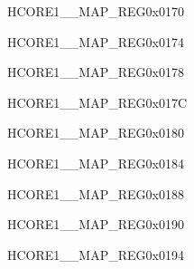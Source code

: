 \begin{register}{H}{CORE1\_\_MAP\_REG}{0x0170}\label{regdesc:CORE1SBDINTMAPREG}
\end{register}\vspace{-3em}


\begin{register}{H}{CORE1\_\_MAP\_REG}{0x0174}\label{regdesc:CORE1USBOTGINTMAPREG}
\end{register}\vspace{-3em}


\begin{register}{H}{CORE1\_\_MAP\_REG}{0x0178}\label{regdesc:CORE1USBOTGENDPMULTIPROCINTMAPREG}
\end{register}\vspace{-3em}


\begin{register}{H}{CORE1\_\_MAP\_REG}{0x017C}\label{regdesc:CORE1JPEGINTMAPREG}
\end{register}\vspace{-3em}


\begin{register}{H}{CORE1\_\_MAP\_REG}{0x0180}\label{regdesc:CORE1PPAINTMAPREG}
\end{register}\vspace{-3em}


\begin{register}{H}{CORE1\_\_MAP\_REG}{0x0184}\label{regdesc:CORE1CORE0TRACEINTMAPREG}
\end{register}\vspace{-3em}


\begin{register}{H}{CORE1\_\_MAP\_REG}{0x0188}\label{regdesc:CORE1CORE1TRACEINTMAPREG}
\end{register}\vspace{-3em}




\begin{register}{H}{CORE1\_\_MAP\_REG}{0x0190}\label{regdesc:CORE1ISPINTMAPREG}
\end{register}\vspace{-3em}


\begin{register}{H}{CORE1\_\_MAP\_REG}{0x0194}\label{regdesc:CORE1I3CMSTINTMAPREG}
\end{register}\vspace{-3em}


